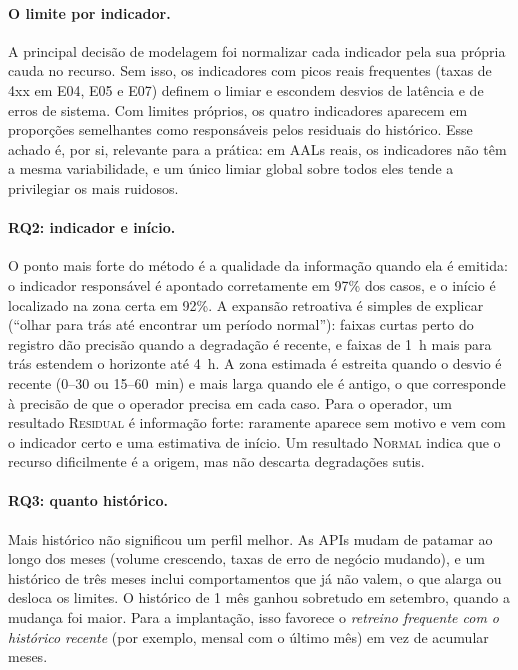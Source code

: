 \documentclass[sigconf,nonacm]{acmart}
\newcommand{\Normal}{\textsc{Normal}\xspace}
\newcommand{\Residual}{\textsc{Residual}\xspace}
\begin{document}
\paragraph{O limite por indicador.} A principal decisão de modelagem foi normalizar cada indicador pela sua própria cauda no recurso. Sem isso, os indicadores com picos reais frequentes (taxas de 4xx em E04, E05 e E07) definem o limiar e escondem desvios de latência e de erros de sistema. Com limites próprios, os quatro indicadores aparecem em proporções semelhantes como responsáveis pelos residuais do histórico. Esse achado é, por si, relevante para a prática: em AALs reais, os indicadores não têm a mesma variabilidade, e um único limiar global sobre todos eles tende a privilegiar os mais ruidosos.

\paragraph{RQ2: indicador e início.} O ponto mais forte do método é a qualidade da informação quando ela é emitida: o indicador responsável é apontado corretamente em 97\% dos casos, e o início é localizado na zona certa em 92\%. A expansão retroativa é simples de explicar (``olhar para trás até encontrar um período normal''): faixas curtas perto do registro dão precisão quando a degradação é recente, e faixas de 1~h mais para trás estendem o horizonte até 4~h. A zona estimada é estreita quando o desvio é recente (0--30 ou 15--60~min) e mais larga quando ele é antigo, o que corresponde à precisão de que o operador precisa em cada caso. Para o operador, um resultado \Residual é informação forte: raramente aparece sem motivo e vem com o indicador certo e uma estimativa de início. Um resultado \Normal indica que o recurso dificilmente é a origem, mas não descarta degradações sutis.

\paragraph{RQ3: quanto histórico.} Mais histórico não significou um perfil melhor. As APIs mudam de patamar ao longo dos meses (volume crescendo, taxas de erro de negócio mudando), e um histórico de três meses inclui comportamentos que já não valem, o que alarga ou desloca os limites. O histórico de 1 mês ganhou sobretudo em setembro, quando a mudança foi maior. Para a implantação, isso favorece o \emph{retreino frequente com o histórico recente} (por exemplo, mensal com o último mês) em vez de acumular meses.
\end{document}
